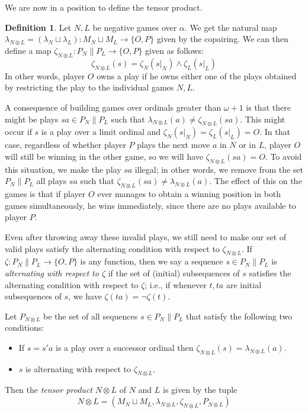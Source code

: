 \documentclass[11pt]{article} %
\theoremstyle{plain} %
\theoremstyle{definition} %
\newtheorem{definition}[theorem]{Definition}
\theoremstyle{exercisestyle}
\newcommand*\from{\colon}
\newcommand{\cmap}[3]{#1\from{}#2\to{}#3}
\newcommand{\tensor}{\otimes}
\newcommand{\cprd}{\sqcup}
\newcommand{\OP}{\{O,P\}}
\begin{document}
We are now in a position to define the tensor product.

\begin{definition}
  Let $N,L$ be negative games over $\alpha$.  We get the natural map $\lambda_{N\tensor L}=\cmap{(\lambda_N\cprd \lambda_L)}{M_N\cprd M_L}{\OP}$ given by the copairing.  We can then define a map $\cmap{\zeta_{N\tensor L}}{P_N\| P_L}{\OP}$ given as follows:
  \[
    \zeta_{N\tensor L}(s)=\zeta_N(s\vert_N)\wedge\zeta_L(s\vert_L)
  \]
  In other words, player $O$ owns a play if he owns either one of the plays obtained by restricting the play to the individual games $N,L$.

  A consequence of building games over ordinals greater than $\omega+1$ is that there might be plays $sa\in P_N\|P_L$ such that $\lambda_{N\tensor L}(a)\ne\zeta_{N\tensor L}(sa)$.  This might occur if $s$ is a play over a limit ordinal and $\zeta_N(s\vert_N)=\zeta_L(s\vert_L)=O$.  In that case, regardless of whether player $P$ plays the next move $a$ in $N$ or in $L$, player $O$ will still be winning in the other game, so we will have $\zeta_{N\tensor L}(sa)=O$.  To avoid this situation, we make the play $sa$ illegal; in other words, we remove from the set $P_N\|P_L$ all plays $sa$ such that $\zeta_{N\tensor L}(sa)\ne\lambda_{N\tensor L}(a)$.  The effect of this on the games is that if player $O$ ever manages to obtain a winning position in both games simultaneously, he wins immediately, since there are no plays available to player $P$.

  Even after throwing away these invalid plays, we still need to make our set of valid plays satisfy the alternating condition with respect to $\zeta_{N\tensor L}$.  If $\cmap{\zeta}{P_N\|P_L}{\OP}$ is any function, then we say a sequence $s\in P_N\|P_L$ is \emph{alternating with respect to $\zeta$} if the set of (initial) subsequences of $s$ satisfies the alternating condition with respect to $\zeta$; i.e., if whenever $t,ta$ are initial subsequences of $s$, we have $\zeta(ta)=\neg\zeta(t)$.  

  Let $P_{N\tensor L}$ be the set of all sequences $s\in P_N\|P_L$ that satisfy the following two conditions:
  \begin{itemize}
    \item If $s=s'a$ is a play over a successor ordinal then $\zeta_{N\tensor L}(s)=\lambda_{N\tensor L}(a)$.
    \item $s$ is alternating with respect to $\zeta_{N\tensor L}$.
  \end{itemize}
  Then the \emph{tensor product} $N\tensor L$ of $N$ and $L$ is given by the tuple
  \[
    N\tensor L=(M_N\cprd M_L,\lambda_{N\tensor L},\zeta_{N\tensor L},P_{N\tensor L})
  \]
\end{definition}
\end{document}
